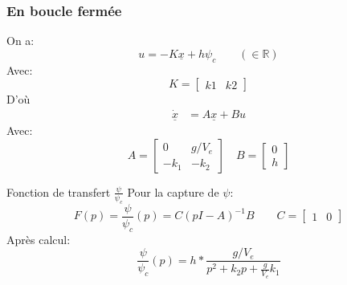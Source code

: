 \documentclass[footheight=2em]{beamer}
\begin{document}
\begin{frame}
    \frametitle{En boucle fermée} \pause{}
    On a:
    \[
    u = -K \underline{x} + h \psi_c \qquad (\in \mathbb{R})
    \] \pause{}
    Avec:
    \[
    K = \begin{bmatrix}
           k1 & k2
       \end{bmatrix}
   \] \pause{}
   D'où
   \[
       \begin{aligned}
           \dot{\underline{x}} &= A\underline{x} + Bu
       \end{aligned}
    \] \pause{}
    Avec:
    \[
       A = \begin{bmatrix}
           0 & g/V_e\\
           -k_1 & -k_2
       \end{bmatrix}
       \quad
       B = \begin{bmatrix}
           0 \\ h
       \end{bmatrix}
   \]
\end{frame}

\begin{frame}{Fonction de transfert \( \frac{\psi}{\psi_c} \)}
    Pour la capture de \( \psi \):
    \[
    F(p) = \frac{\psi}{\psi_c}(p) = C{(pI - A)}^{-1}B \qquad C=\begin{bmatrix}
            1 & 0
        \end{bmatrix}
    \] \pause{}
    Après calcul:
    \begin{equation*}
        \boxed{
            \frac{\psi}{\psi_c}(p) = h * \frac{g/V_e}{p^2 + k_2 p + \frac{g}{V_e}k_1}
        }
    \end{equation*}
\end{frame}
\end{document}
